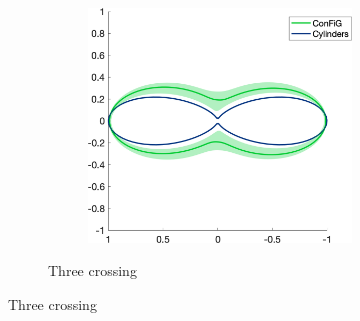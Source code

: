 \begin{figure}
\begin{subfigure}[]{\textwidth}
\begin{subfigure}[]{0.3\textwidth}
  \end{subfigure}
  ~
  \begin{subfigure}[]{0.3\textwidth}
    \includegraphics[width=\textwidth]{figures/frf_experiment/threeperp_prctiles_b_3000}
  \end{subfigure}
  \caption{Three crossing}
  \end{subfigure}


\end{figure}

